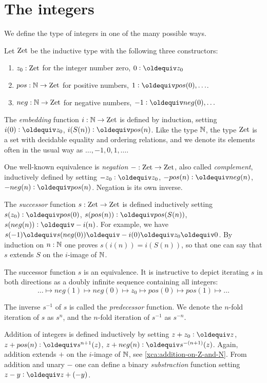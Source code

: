 \documentclass[a4,12pt]{amsart}
\begin{document}


\section{The integers}
\label{sec:integers}

We define the type of integers in one of the many possible ways.

\begin{definition}\label{def:integers}
Let $\mathrm{Zet}$ be the inductive type with the following three constructors:
\begin{enumerate}
\item $z_0: \mathrm{Zet}$ for the integer number zero, 
$0 \defeq z_0$
\item $pos: \mathbb{N} \to \mathrm{Zet}$ for positive numbers,
$1 \defeq pos(0),\ldots$.
\item $neg: \mathbb{N} \to \mathrm{Zet}$ for negative numbers, 
$-1 \defeq neg(0),\ldots$
\end{enumerate}

The \emph{embedding} function $i:\mathbb{N}\to\mathrm{Zet}$ is defined by induction,
setting $i(0)\defeq z_0$, $i(S(n))\defeq pos(n)$.
Like the type $\mathbb{N}$, the type $\mathrm{Zet}$ is a set with decidable equality
and ordering relations,
and we denote its elements often in the usual way as $\ldots,-1,0,1,\ldots$.

One well-known equivalence is \emph{negation} ${-}:\mathrm{Zet}\to\mathrm{Zet}$, 
also called \emph{complement}, inductively defined by setting 
$-z_0\defeq z_0$, 
$-pos(n)\defeq neg(n)$, 
$-neg(n)\defeq pos(n)$.
Negation is its own inverse.

The \emph{successor} function $s:\mathrm{Zet}\to\mathrm{Zet}$ is defined inductively setting 
$s(z_0)\defeq pos(0)$, 
$s(pos(n))\defeq pos(S(n))$,
$s(neg(n))\defeq -i(n)$. For example, we have
$s(-1)\jdeq s(neg(0))\jdeq -i(0) \jdeq z_0 \jdeq 0$.
By induction on $n:\mathbb{N}$ one proves $s(i(n))=i(S(n))$, 
so that one can say that $s$ extends $S$
on the $i$-image of $\mathbb{N}$. 

The successor function $s$ is an equivalence.
It is instructive to depict iterating $s$ in both directions as 
a doubly infinite sequence containing all integers:
\[
\ldots \mapsto neg(1) \mapsto neg(0) \mapsto z_0 \mapsto pos(0) \mapsto pos(1) \mapsto \ldots
\]

The inverse $s^{-1}$ of $s$ is called the \emph{predecessor} function.
We denote the $n$-fold iteration of $s$ as $s^n$, and
the $n$-fold iteration of $s^{-1}$ as $s^{-n}$.

Addition of integers is defined inductively by setting
$z + z_0\defeq z$, 
$z + pos(n)\defeq s^{n+1}(z)$, 
$z + neg(n)\defeq s^{-(n+1)}(z)$.
Again, addition extends $+$ on the $i$-image of $\mathbb{N}$,
see \cref{xca:addition-on-Z-and-N}. 
From addition and unary $-$ one can define a binary
\emph{substraction} function setting $z-y \defeq z+(-y)$.
\end{definition}
\end{document}
